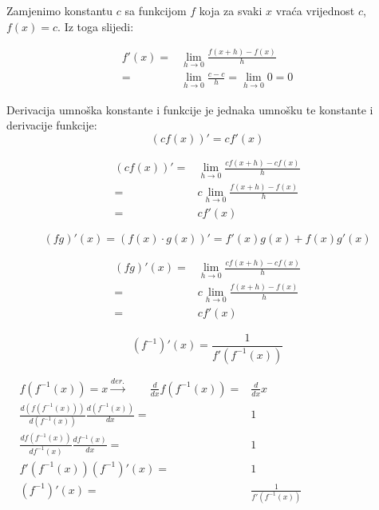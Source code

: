 \begin{multicols}{2}
Zamjenimo konstantu $c$ sa funkcijom $f$ koja za svaki $x$ vraća vrijednost $c$, $f(x)=c$.
Iz toga slijedi:

\begin{align*}
    f'(x) =& \lim_{h\to 0}\frac{f(x+h)-f(x)}{h}\\
          =& \lim_{h\to 0}\frac{c - c}{h} = \lim_{h\to 0}0 = 0
\end{align*}


\newcolumn

\begin{proposition}
    Derivacija umnoška konstante i funkcije je jednaka umnošku te konstante i derivacije funkcije:
    $$
        (cf(x))' = cf'(x)
    $$
\end{proposition}

\begin{align*}
    (cf(x))'=&\lim_{h\to 0}\frac{cf(x+h)-cf(x)}{h}\\
            =&c\lim_{h\to 0}\frac{f(x+h)-f(x)}{h}\\
            =&cf'(x)
\end{align*}

\begin{proposition}
    \label{eq:diff_prod}
    $$
        (fg)'(x) = (f(x)\cdot g(x))' = f'(x)g(x) + f(x)g'(x)
    $$
\end{proposition}

\begin{align*}
    (fg)'(x)=&\lim_{h\to 0}\frac{cf(x+h)-cf(x)}{h}\\
    =&c\lim_{h\to 0}\frac{f(x+h)-f(x)}{h}\\
    =&cf'(x)
\end{align*}

\begin{proposition}
    $$
        (f^{-1})'(x) = \frac{1}{f'(f^{-1}(x))}
    $$
\end{proposition}

\begin{align*}
    f(f^{-1}(x)) = x \xrightarrow{der.}\qquad \frac{d}{dx} f(f^{-1}(x)) =& \frac{d}{dx} x \phantom{f(f^{-1}(x)) = x \to\qquad}\\
    \frac{d\left( f(f^{-1}(x)) \right)}{d\left( f^{-1}(x) \right)} \frac{d\left(f^{-1}(x)\right)}{dx}
    =& 1 \\
    \frac{df(f^{-1}(x))}{df^{-1}(x)} \frac{df^{-1}(x)}{dx}
    =& 1 \\
    f'(f^{-1}(x))
    (f^{-1})'(x)
    =& 1\\
    (f^{-1})'(x)
    =& \frac{1}{f'(f^{-1}(x))}\\
\end{align*}


\end{multicols}

